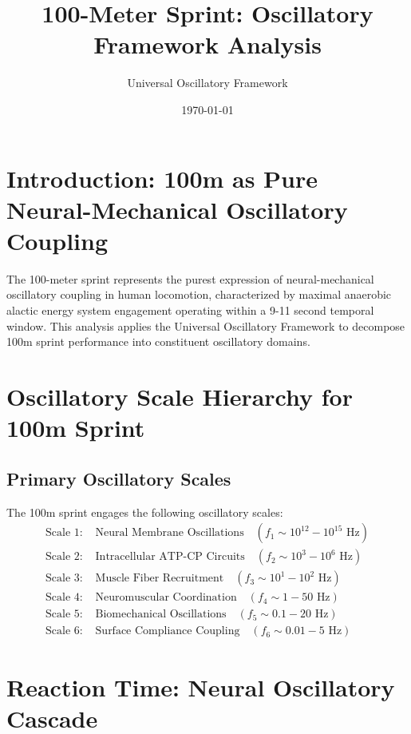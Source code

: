 \documentclass[12pt]{article}
\title{100-Meter Sprint: Oscillatory Framework Analysis}
\author{Universal Oscillatory Framework}
\date{\today}
\begin{document}
\maketitle

\section{Introduction: 100m as Pure Neural-Mechanical Oscillatory Coupling}

The 100-meter sprint represents the purest expression of neural-mechanical oscillatory coupling in human locomotion, characterized by maximal anaerobic alactic energy system engagement operating within a 9-11 second temporal window. This analysis applies the Universal Oscillatory Framework to decompose 100m sprint performance into constituent oscillatory domains.

\section{Oscillatory Scale Hierarchy for 100m Sprint}

\subsection{Primary Oscillatory Scales}

\begin{definition}
The 100m sprint engages the following oscillatory scales:
\begin{align}
\text{Scale 1: } &\text{Neural Membrane Oscillations} \quad (f_1 \sim 10^{12}-10^{15} \text{ Hz}) \\
\text{Scale 2: } &\text{Intracellular ATP-CP Circuits} \quad (f_2 \sim 10^3-10^6 \text{ Hz}) \\
\text{Scale 3: } &\text{Muscle Fiber Recruitment} \quad (f_3 \sim 10^{1}-10^{2} \text{ Hz}) \\
\text{Scale 4: } &\text{Neuromuscular Coordination} \quad (f_4 \sim 1-50 \text{ Hz}) \\
\text{Scale 5: } &\text{Biomechanical Oscillations} \quad (f_5 \sim 0.1-20 \text{ Hz}) \\
\text{Scale 6: } &\text{Surface Compliance Coupling} \quad (f_6 \sim 0.01-5 \text{ Hz})
\end{align}
\end{definition}

\section{Reaction Time: Neural Oscillatory Cascade}
\end{document}
